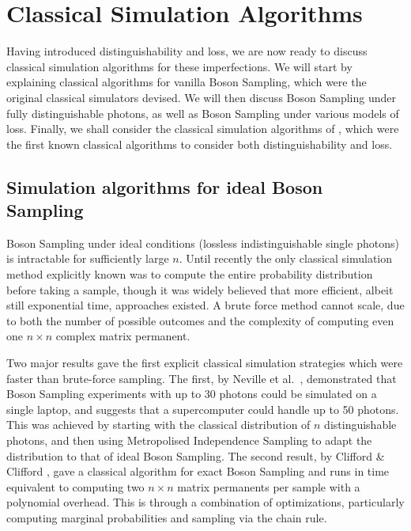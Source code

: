 \section{Classical Simulation Algorithms}
\label{sec:classical-simulations}

Having introduced distinguishability and loss, we are now ready to discuss classical simulation algorithms for these imperfections. We will start by explaining classical algorithms for vanilla Boson Sampling, which were the original classical simulators devised. We will then discuss Boson Sampling under fully distinguishable photons, as well as Boson Sampling under various models of loss. Finally, we shall consider the classical simulation algorithms of \cite{renema2018, renema2018loss}, which were the first known classical algorithms to consider both distinguishability and loss.

\subsection{Simulation algorithms for ideal Boson Sampling}

Boson Sampling under ideal conditions (lossless indistinguishable single photons) is intractable for sufficiently large $n$. 
Until recently the only classical simulation method explicitly known was to compute the entire probability distribution before taking a sample, though it was widely believed that more efficient, albeit still exponential time, approaches existed. 
A brute force method cannot scale, due to both the number of possible outcomes and the complexity of computing even one $n\times n$ complex matrix permanent.

Two major results gave the first explicit classical simulation strategies which were faster than brute-force sampling. 
The first, by Neville et al.~\cite{neville2017}, demonstrated that Boson Sampling experiments with up to 30 photons could be simulated on a single laptop, and suggests that a supercomputer could handle up to 50 photons. 
This was achieved by starting with the classical distribution of $n$ distinguishable photons, and then using Metropolised Independence Sampling to adapt the distribution to that of ideal Boson Sampling.
The second result, by Clifford \& Clifford \cite{clifford2017}, gave a classical algorithm for exact Boson Sampling and runs in time equivalent to computing two $n \times n$ matrix  permanents per sample with a polynomial overhead. 
This is through a combination of optimizations, particularly computing marginal probabilities and sampling via the chain rule.

